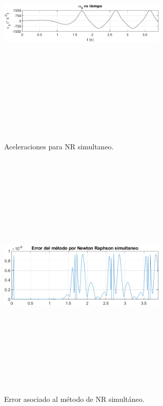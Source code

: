\documentclass[12pt]{article}
\begin{document}
\begin{multicols}{2}
\begin{figure} [H]
    \end{figure}
        \vspace{-25pt}
        \begin{figure} [H]
        \centerline{\includegraphics[width=8cm, height=12cm,keepaspectratio]{NR Simultaneo/alpha3.png}}
        \caption{Aceleraciones para NR simultaneo.}
        \label{}
    \end{figure}
        \begin{figure} [H]
        \centerline{\includegraphics[width=8cm, height=12cm,keepaspectratio]{Implementacion/error Resultados NR.png}}
        \caption{Error asociado al método de NR simultáneo.}
        \label{ERRORNR}
    \end{figure}   
\end{multicols}
\end{document}
